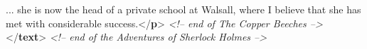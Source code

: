\begin{shaded}
\hspace*{1em}\hspace*{1em}\hspace*{1em}\hspace*{1em}\hspace*{1em}\hspace*{1em}\hspace*{1em}\hspace*{1em} \mbox{}\newline 
\hspace*{1em}\hspace*{1em}\hspace*{1em}\hspace*{1em}\hspace*{1em}\hspace*{1em}\hspace*{1em}\hspace*{1em} ... she is now the head of a private school\mbox{}\newline 
\hspace*{1em}\hspace*{1em}\hspace*{1em}\hspace*{1em}\hspace*{1em}\hspace*{1em}\hspace*{1em}\hspace*{1em} at Walsall, where I believe that she has\mbox{}\newline 
\hspace*{1em}\hspace*{1em}\hspace*{1em}\hspace*{1em}\hspace*{1em}\hspace*{1em}\hspace*{1em}\hspace*{1em} met with considerable success.{</\textbf{p}>}\mbox{}\newline 
\hspace*{1em}\hspace*{1em}\mbox{}\newline 
\hspace*{1em}\mbox{}\newline 
\textit{<!-- end of The Copper Beeches -->}\mbox{}\newline 
{}\mbox{}\newline 
{</\textbf{text}>}\mbox{}\newline 
\textit{<!-- end of the Adventures of Sherlock Holmes -->}\end{shaded}\egroup\par \noindent  \par

